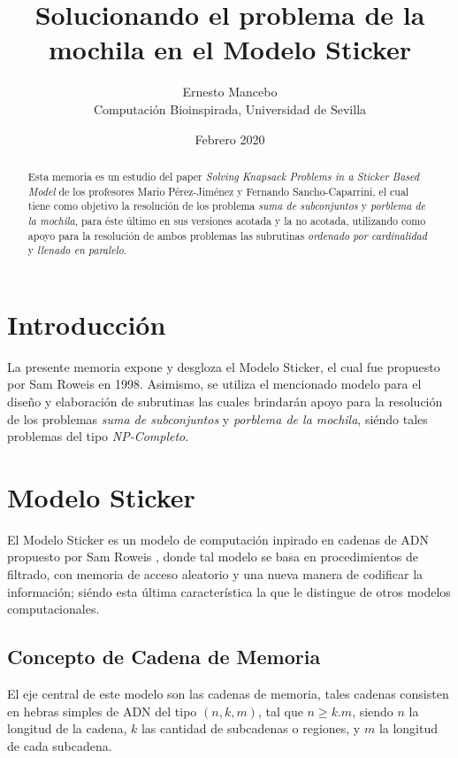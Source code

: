 \documentclass[12pt, letterpaper, twoside]{article}
\title{Solucionando el problema de la mochila en el Modelo Sticker}
\author{Ernesto Mancebo \\ Computación Bioinspirada, Universidad de Sevilla}
\date{Febrero 2020}
\begin{document}
    \maketitle
    \begin{abstract}
        Esta memoria es un estudio del paper \emph{Solving Knapsack Problems in a Sticker Based Model} de los profesores Mario P{\'e}rez-Jim{\'e}nez y Fernando Sancho-Caparrini\autocite{ref10.1007/3-540-48017-X_15}, el cual tiene como objetivo la resolución de los problema \emph{suma de subconjuntos} y \emph{porblema de la mochila}, para éste último en sus versiones acotada y la no acotada, utilizando como apoyo para la resolución de ambos problemas las subrutinas \emph{ordenado por cardinalidad} y \emph{llenado en paralelo}.
    \end{abstract}

    \newpage

    \begin{spacing}{0.01}
        \tableofcontents
    \end{spacing}

    \newpage
    \section{Introducción}
    La presente memoria expone y desgloza el Modelo Sticker, el cual fue propuesto por Sam Roweis en 1998. Asimismo, se utiliza el mencionado modelo para el diseño y elaboración de subrutinas las cuales brindarán apoyo para la resolución de los problemas \emph{suma de subconjuntos} y \emph{porblema de la mochila}, siéndo tales problemas del tipo \emph{NP-Completo}.

    \section{Modelo Sticker}
    El Modelo Sticker es un modelo de computación inpirado en cadenas de ADN propuesto por Sam Roweis \autocite{sticker_model}, donde tal modelo se basa en procedimientos de filtrado, con memoria de acceso aleatorio y una nueva manera de codificar la información; siéndo esta última característica la que le distingue de otros modelos computacionales.

    \subsection{Concepto de Cadena de Memoria}
    El eje central de este modelo son las cadenas de memoria, tales cadenas consisten en hebras simples de ADN del tipo $(n, k, m)$, tal que $n\geq k.m$, siendo $n$ la longitud de la cadena, $k$ las cantidad de subcadenas o regiones, y $m$ la longitud de cada subcadena.
\end{document}
